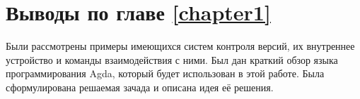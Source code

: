 \section{Выводы по главе \ref{chapter1}}

Были рассмотрены примеры имеющихся систем контроля версий, их
внутреннее устройство и команды взаимодействия с ними. Был дан краткий
обзор языка программирования Agda, который будет использован в этой
работе. Была сформулирована решаемая зачада и описана идея её решения.
